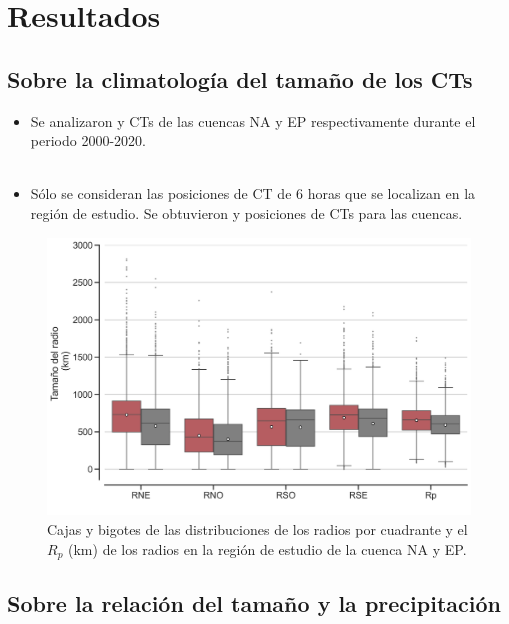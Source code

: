 \section{Resultados}

\subsection{Sobre la climatología del tamaño de los CTs}
\begin{frame}
\begin{itemize}
    \item Se analizaron {} y {} CTs de las cuencas {\red NA} y {\gray EP} respectivamente durante el periodo 2000-2020.
    \\~\
    \item Sólo se consideran las posiciones de CT de 6 horas que se localizan en la región de estudio. Se obtuvieron {} y {} posiciones de CTs para las cuencas.
\end{itemize}
\end{frame}

\begin{frame}
    \begin{figure}
        \centering
        \includegraphics[scale = 0.35]{Images/Figures/Fig_3_1.jpeg}
        \caption{Cajas y bigotes de las distribuciones de los radios por cuadrante y el $R_p$ (km) de los radios en la región de estudio de la cuenca {\red NA} y {\gray EP}.}
        \label{fig:fig_9}
    \end{figure}
\end{frame}

\subsection{Sobre la relación del tamaño y la precipitación}
\begin{frame}

\end{frame}

